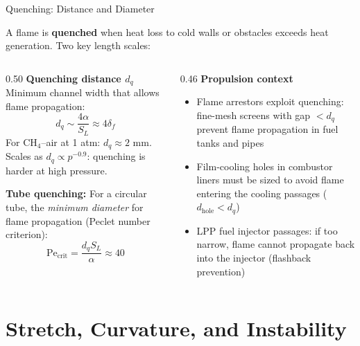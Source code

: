 \documentclass[12pt,aspectratio=169]{beamer}
\newcommand{\Pe}{\mathrm{Pe}}
\newcommand{\SL}{S_L}
\newcommand{\lf}{\delta_f}
\newcommand{\alphath}{\alpha}
\begin{document}
\begin{frame}{Quenching: Distance and Diameter}

  A flame is \textbf{quenched} when heat loss to cold walls or obstacles
  exceeds heat generation.  Two key length scales:

  \begin{columns}[t]
    \begin{column}{0.50\textwidth}
      \textbf{Quenching distance $d_q$}\\
      Minimum channel width that allows flame propagation:
      \[
        d_q \sim \frac{4\alphath}{\SL}
        \approx 4\lf
      \]
      For CH$_4$--air at 1 atm: $d_q \approx 2$ mm.\\
      Scales as $d_q \propto p^{-0.9}$: quenching is harder at
      high pressure.

      \smallskip
      \textbf{Tube quenching:}
      For a circular tube, the \emph{minimum diameter}
      for flame propagation (Peclet number criterion):
      \[
        \Pe_{\text{crit}} = \frac{d_q \SL}{\alphath} \approx 40
      \]
    \end{column}
    \begin{column}{0.46\textwidth}
      \textbf{Propulsion context}\\
      \begin{itemize}
        \item Flame arrestors exploit quenching: fine-mesh
              screens with gap $< d_q$ prevent flame propagation
              in fuel tanks and pipes
        \item Film-cooling holes in combustor liners must
              be sized to avoid flame entering the cooling
              passages ($d_{\text{hole}} < d_q$)
        \item LPP fuel injector passages: if too narrow,
              flame cannot propagate back into the injector
              (flashback prevention)
      \end{itemize}
    \end{column}
  \end{columns}
\end{frame}

\section{Stretch, Curvature, and Instability}
\end{document}
